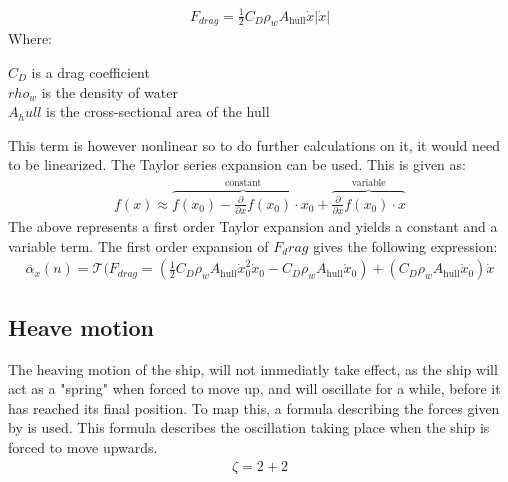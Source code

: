 \begin{align}
F_{drag} = \frac{1}{2}C_D \rho_w A_\text{hull} \dot{x} |\dot{x}|
\end{align}
\noindent Where:
\begin{ffk}
$C_D$ is a drag coefficient\\
$rho_w$ is the density of water\\
$A_hull$ is the cross-sectional area of the hull\\
\end{ffk}
This term is however nonlinear so to do further calculations on it, it would need to be linearized. The Taylor series expansion can be used. This is given as:
\begin{align}
f(x) \approx \overbrace{f(x_0) - \frac{\partial}{\partial x}f(x_0)\cdot x_0}^\text{constant} + \overbrace{\frac{\partial}{\partial x}f(x_0) \cdot x}^\text{variable}
\end{align}
The above represents a first order Taylor expansion and yields a constant and a variable term. The first order expansion of $F_drag$ gives the following expression:
\begin{align}
\overline{\alpha}_x(n) = \mathcal{T}(F_{drag} = \left(\frac{1}{2}C_D \rho_w A_\text{hull} \dot{x}_0^2 \dot{x}_0 - C_D \rho_w A_\text{hull} \dot{x}_0 \right) + (C_D \rho_w A_\text{hull} \dot{x}_0)\dot{x}
\end{align}

\subsection{Heave motion}
The heaving motion of the ship, will not immediatly take effect, as the ship will act as a "spring" when forced to move up, and will oscillate for a while, before it has reached its final position. To map this, a formula describing the forces given by  is used. This formula describes the oscillation taking place when the ship is forced to move upwards. 
\begin{align}
\zeta = 2+2
\end{align}